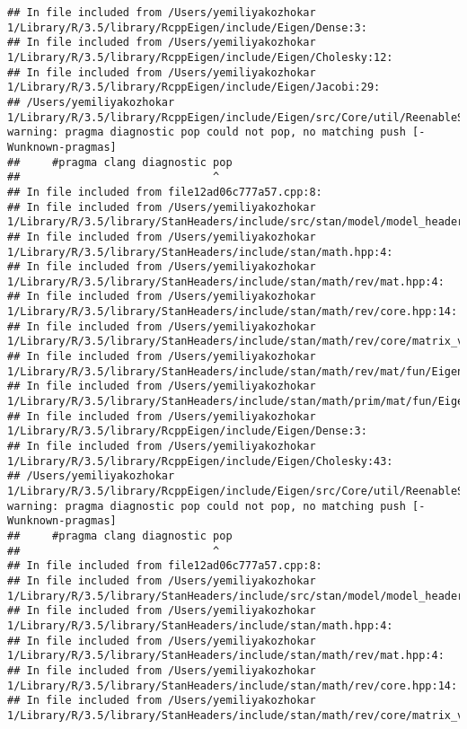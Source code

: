 \documentclass[]{article}
\begin{document}
\begin{verbatim}
## In file included from /Users/yemiliyakozhokar 1/Library/R/3.5/library/RcppEigen/include/Eigen/Dense:3:
## In file included from /Users/yemiliyakozhokar 1/Library/R/3.5/library/RcppEigen/include/Eigen/Cholesky:12:
## In file included from /Users/yemiliyakozhokar 1/Library/R/3.5/library/RcppEigen/include/Eigen/Jacobi:29:
## /Users/yemiliyakozhokar 1/Library/R/3.5/library/RcppEigen/include/Eigen/src/Core/util/ReenableStupidWarnings.h:10:30: warning: pragma diagnostic pop could not pop, no matching push [-Wunknown-pragmas]
##     #pragma clang diagnostic pop
##                              ^
## In file included from file12ad06c777a57.cpp:8:
## In file included from /Users/yemiliyakozhokar 1/Library/R/3.5/library/StanHeaders/include/src/stan/model/model_header.hpp:4:
## In file included from /Users/yemiliyakozhokar 1/Library/R/3.5/library/StanHeaders/include/stan/math.hpp:4:
## In file included from /Users/yemiliyakozhokar 1/Library/R/3.5/library/StanHeaders/include/stan/math/rev/mat.hpp:4:
## In file included from /Users/yemiliyakozhokar 1/Library/R/3.5/library/StanHeaders/include/stan/math/rev/core.hpp:14:
## In file included from /Users/yemiliyakozhokar 1/Library/R/3.5/library/StanHeaders/include/stan/math/rev/core/matrix_vari.hpp:4:
## In file included from /Users/yemiliyakozhokar 1/Library/R/3.5/library/StanHeaders/include/stan/math/rev/mat/fun/Eigen_NumTraits.hpp:4:
## In file included from /Users/yemiliyakozhokar 1/Library/R/3.5/library/StanHeaders/include/stan/math/prim/mat/fun/Eigen.hpp:4:
## In file included from /Users/yemiliyakozhokar 1/Library/R/3.5/library/RcppEigen/include/Eigen/Dense:3:
## In file included from /Users/yemiliyakozhokar 1/Library/R/3.5/library/RcppEigen/include/Eigen/Cholesky:43:
## /Users/yemiliyakozhokar 1/Library/R/3.5/library/RcppEigen/include/Eigen/src/Core/util/ReenableStupidWarnings.h:10:30: warning: pragma diagnostic pop could not pop, no matching push [-Wunknown-pragmas]
##     #pragma clang diagnostic pop
##                              ^
## In file included from file12ad06c777a57.cpp:8:
## In file included from /Users/yemiliyakozhokar 1/Library/R/3.5/library/StanHeaders/include/src/stan/model/model_header.hpp:4:
## In file included from /Users/yemiliyakozhokar 1/Library/R/3.5/library/StanHeaders/include/stan/math.hpp:4:
## In file included from /Users/yemiliyakozhokar 1/Library/R/3.5/library/StanHeaders/include/stan/math/rev/mat.hpp:4:
## In file included from /Users/yemiliyakozhokar 1/Library/R/3.5/library/StanHeaders/include/stan/math/rev/core.hpp:14:
## In file included from /Users/yemiliyakozhokar 1/Library/R/3.5/library/StanHeaders/include/stan/math/rev/core/matrix_vari.hpp:4:

\end{verbatim}
\end{document}
